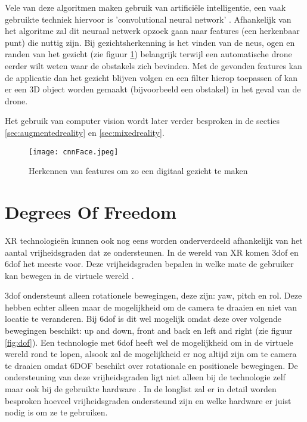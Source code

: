Vele van deze algoritmen maken gebruik van artificiële intelligentie, een vaak gebruikte techniek hiervoor is 'convolutional neural network' \autocite{Ji2013}. Afhankelijk van het algoritme zal dit neuraal netwerk opzoek gaan naar features (een herkenbaar punt) die nuttig zijn. Bij gezichtsherkenning is het vinden van de neus, ogen en randen van het gezicht (zie figuur \ref{fig:cnnface}) belangrijk terwijl een automatische drone eerder wilt weten waar de obstakels zich bevinden. Met de gevonden features kan de applicatie dan het gezicht blijven volgen en een filter hierop toepassen of kan er een 3D object worden gemaakt (bijvoorbeeld een obstakel) in het geval van de drone. 

Het gebruik van computer vision wordt later verder besproken in de secties \ref{sec:augmentedreality} en \ref{sec:mixedreality}.

\begin{figure}
    \texttt{[image: cnnFace.jpeg]}
    \caption{Herkennen van features om zo een digitaal gezicht te maken \autocite{Murray2017}}
    \label{fig:cnnface}
\end{figure}

\section{Degrees Of Freedom}

XR technologieën kunnen ook nog eens worden onderverdeeld afhankelijk van het aantal vrijheidsgraden dat ze ondersteunen. In de wereld van XR komen \acrshort{3dof} en \acrshort{6dof} het meeste voor. Deze vrijheidsgraden bepalen in welke mate de gebruiker kan bewegen in de virtuele wereld \autocite{Chen1995}.

\acrshort{3dof} ondersteunt alleen rotationele bewegingen, deze zijn: yaw, pitch en rol. Deze hebben echter alleen maar de mogelijkheid om de camera te draaien en niet van locatie te veranderen. Bij \acrshort{6dof} is dit wel mogelijk omdat deze over volgende bewegingen beschikt: up and down, front and back en left and right (zie figuur \ref{fig:dof}).
Een technologie met \acrshort{6dof} heeft wel de mogelijkheid om in de virtuele wereld rond te lopen, alsook zal de mogelijkheid er nog altijd zijn om te camera te draaien omdat 6DOF beschikt over rotationale en positionele bewegingen. De ondersteuning van deze vrijheidsgraden ligt niet alleen bij de technologie zelf maar ook bij de gebruikte hardware \autocite{Chen1995}. In de longlist zal er in detail worden besproken hoeveel vrijheidsgraden ondersteund zijn en welke hardware er juist nodig is om ze te gebruiken.

